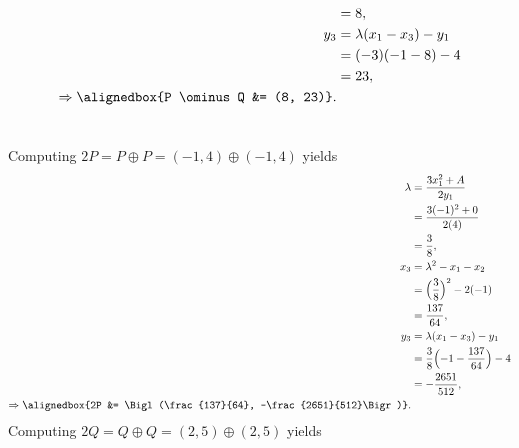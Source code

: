 \documentclass[
  coursecode={MTHE 418},
  assignmentname={Homework \homeworknumber},
  studentnumber=20053722,
  name={Bryan Hoang},
  draft,
]{
  ltxanswer%
}
\begin{document}
\begin{questions}
\begin{parts}
\begin{solution}
\begin{align*}
                                              &= 8,                                  \\
          y_{3}                               &= \lambda(x_{1} - x_{3}) - y_{1}      \\
                                              &= (-3) (-1 - 8) - 4                   \\
                                              &= 23,                                 \\
          \Rightarrow \alignedbox{P \ominus Q &= (8, 23)}.
        \end{align*}
      \end{solution}

      \newpage

      \part{}
      \begin{solution}
        Computing \(2P = P \oplus P = (-1, 4) \oplus (-1, 4)\) yields
        \begin{align*}
          \lambda                    &= \frac{3 x_{1}^{2} + A}{2 y_{1}}                 \\
                                     &= \frac{3 (-1)^{2} + 0}{2 (4)}                    \\
                                     &= \frac{3}{8},                                    \\
          x_{3}                      &= \lambda^{2} - x_{1} - x_{2}                     \\
                                     &= \Bigl(\frac{3}{8}\Bigr)^{2} - 2 (-1)            \\
                                     &= \frac{137}{64},                                 \\
          y_{3}                      &= \lambda(x_{1} - x_{3}) - y_{1}                  \\
                                     &= \frac{3}{8} \Bigl(-1 - \frac{137}{64}\Bigr) - 4 \\
                                     &= -\frac{2651}{512},                              \\
          \Rightarrow \alignedbox{2P &= \Bigl(\frac{137}{64}, -\frac{2651}{512}\Bigr)}.
        \end{align*}
        Computing \(2Q = Q \oplus Q = (2, 5) \oplus (2, 5)\) yields
        \begin{align*}

\end{align*}
\end{solution}
\end{parts}
\end{questions}
\end{document}
